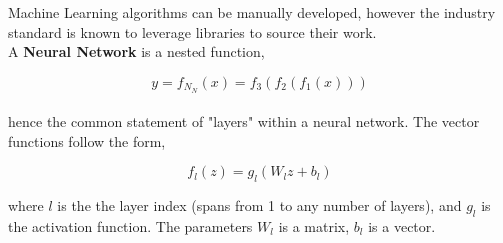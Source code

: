 Machine Learning algorithms can be manually developed, however the industry standard is known to leverage libraries to source their work. \\

A \textbf{Neural Network} is a nested function,

\begin{equation}
    y = f_N_N(x) = f_3(f_2(f_1(x)))
\end{equation}
\\
hence the common statement of "layers" within a neural network. The vector functions follow the form,

\begin{equation}
    f_l(z)=g_l(W_lz + b_l)
\end{equation}

where $l$ is the the layer index (spans from 1 to any number of layers), and $g_l$ is the activation function. The parameters $W_l$ is a matrix, $b_l$ is a vector.